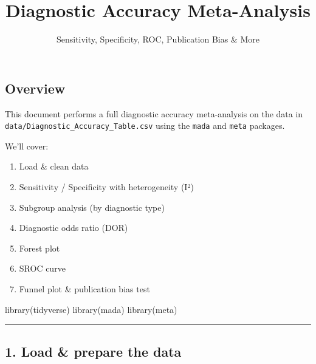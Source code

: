 \documentclass[
  letterpaper,
  DIV=11,
  numbers=noendperiod]{scrartcl}
\title{Diagnostic Accuracy Meta-Analysis}
\subtitle{Sensitivity, Specificity, ROC, Publication Bias \& More}
\author{}
\date{}
\newenvironment{Shaded}{\begin{snugshade}}{\end{snugshade}}
\newcommand{\FunctionTok}[1]{\textcolor[rgb]{0.28,0.35,0.67}{#1}}
\newcommand{\NormalTok}[1]{\textcolor[rgb]{0.00,0.23,0.31}{#1}}
\providecommand{\tightlist}{%
  \setlength{\itemsep}{0pt}\setlength{\parskip}{0pt}}
\renewcommand*\contentsname{Table of contents}
\newcommand\contentsname{Table of contents}
\begin{document}
\maketitle

\renewcommand*\contentsname{Table of contents}
{
\setcounter{tocdepth}{3}
\tableofcontents
}

\subsection{Overview}\label{overview}

This document performs a full diagnostic accuracy meta-analysis on the
data in \texttt{data/Diagnostic\_Accuracy\_Table.csv} using the
\texttt{mada} and \texttt{meta} packages.

We'll cover:

\begin{enumerate}
\def\labelenumi{\arabic{enumi}.}
\tightlist
\item
  Load \& clean data
\item
  Sensitivity / Specificity with heterogeneity (I²)
\item
  Subgroup analysis (by diagnostic type)
\item
  Diagnostic odds ratio (DOR)
\item
  Forest plot
\item
  SROC curve
\item
  Funnel plot \& publication bias test
\end{enumerate}

\begin{Shaded}
\begin{Highlighting}[]
\FunctionTok{library}\NormalTok{(tidyverse)}
\FunctionTok{library}\NormalTok{(mada)}
\FunctionTok{library}\NormalTok{(meta)}
\end{Highlighting}
\end{Shaded}

\begin{center}\rule{0.5\linewidth}{0.5pt}\end{center}

\subsection{1. Load \& prepare the data}\label{load-prepare-the-data}
\end{document}
